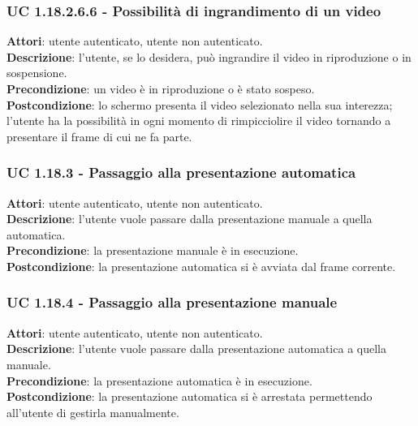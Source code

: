	\subsubsection{UC 1.18.2.6.6 - Possibilità di ingrandimento di un video}{
		\label{uc1.18.2.6.6}
		\textbf{Attori}: utente autenticato, utente non autenticato. \\
		\textbf{Descrizione}: l'utente, se lo desidera, può ingrandire il video in riproduzione o in sospensione. \\
		\textbf{Precondizione}: un video è in riproduzione o è stato sospeso.	\\
		\textbf{Postcondizione}: lo schermo presenta il video selezionato nella sua interezza; l'utente ha la possibilità in ogni momento di rimpicciolire il video tornando a presentare il frame di cui ne fa parte.
	}
	\subsubsection{UC 1.18.3 - Passaggio alla presentazione automatica}{
		\label{uc1.18.3}
		\textbf{Attori}: utente autenticato, utente non autenticato. \\
		\textbf{Descrizione}: l'utente vuole passare dalla presentazione manuale a quella automatica. \\
		\textbf{Precondizione}: la presentazione manuale è in esecuzione.	\\
		\textbf{Postcondizione}: la presentazione automatica si è avviata dal frame corrente.
	}
	\subsubsection{UC 1.18.4 - Passaggio alla presentazione manuale}{
		\label{uc1.18.4}
		\textbf{Attori}: utente autenticato, utente non autenticato. \\
		\textbf{Descrizione}: l'utente vuole passare dalla presentazione automatica a quella manuale. \\
		\textbf{Precondizione}: la presentazione automatica è in esecuzione.	\\
		\textbf{Postcondizione}: la presentazione automatica si è arrestata permettendo all'utente di gestirla manualmente.
	}